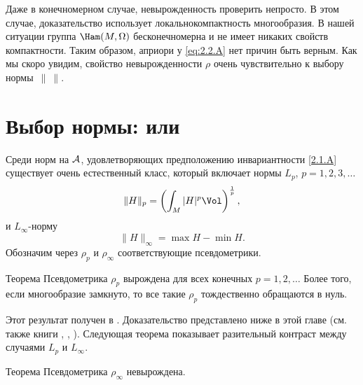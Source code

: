 Даже в конечномерном случае, невырожденность проверить непросто.
В этом случае, доказательство использует локальнокомпактность многообразия.
В нашей ситуации группа $\Ham (M, \Omega)$ бесконечномерна и не имеет никаких свойств компактности.
Таким образом, априори у \ref{eq:2.2.A} нет причин быть верным.
Как мы скоро увидим, свойство невырожденности $\rho$ очень чувствительно к выбору нормы~$\|\ \|$.

\section[Выбор нормы: $L_p$ или $L_\infty$]{Выбор нормы:  или }

Среди норм на $\mathcal{A}$, удовлетворяющих предположению инвариантности \ref{2.1.A} существует очень естественный класс, который включает нормы $L_p$, $p = 1, 2, 3,\dots$
\[\|H\|_p=\left(\int_M|H|^p\Vol\right)^{\frac1p},\]
и $L_\infty$-норму 
\[\|H\|_\infty = \max H - \min H.\]
Обозначим через $\rho_p$ и $\rho_\infty$ соответствующие псевдометрики.

\begin{thm}{Теорема}\label{2.3.A}
Псевдометрика $\rho_p$ вырождена для всех конечных $p = 1, 2,\dots$
Более того, если многообразие замкнуто, то все такие $\rho_p$ тождественно обращаются в нуль.
\end{thm}

Этот результат получен в \cite{EP}.
Доказательство представлено ниже в этой главе (см. также книги \cite{HZ}, \cite{MS}, \cite{AK}).
Следующая теорема показывает разительный контраст между случаями $L_p$ и $L_\infty$.

\begin{thm}{Теорема}\label{2.3.B}
Псевдометрика $\rho_\infty$ невырождена.
\end{thm}

